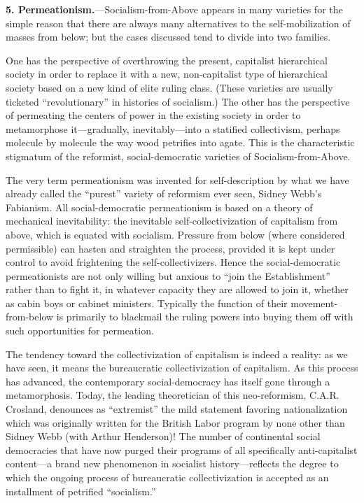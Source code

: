 \textbf{5. Permeationism.}---Socialism-from-Above appears in many varieties for the simple reason that there are always many alternatives to the self-mobilization of masses from below; but the cases discussed tend to divide into two families.

One has the perspective of overthrowing the present, capitalist hierarchical society in order to replace it with a new, non-capitalist type of hierarchical society based on a new kind of elite ruling class. (These varieties are usually ticketed ``revolutionary'' in histories of socialism.) The other has the perspective of permeating the centers of power in the existing society in order to metamorphose it---gradually, inevitably---into a statified collectivism, perhaps molecule by molecule the way wood petrifies into agate. This is the characteristic stigmatum of the reformist, social-democratic varieties of Socialism-from-Above.

The very term permeationism was invented for self-description by what we have already called the ``purest'' variety of reformism ever seen, Sidney Webb's Fabianism. All social-democratic permeationism is based on a theory of mechanical inevitability: the inevitable self-collectivization of capitalism from above, which is equated with socialism. Pressure from below (where considered permissible) can hasten and straighten the process, provided it is kept under control to avoid frightening the self-collectivizers. Hence the social-democratic permeationists are not only willing but anxious to ``join the Establishment'' rather than to fight it, in whatever capacity they are allowed to join it, whether as cabin boys or cabinet ministers. Typically the function of their movement-from-below is primarily to blackmail the ruling powers into buying them off with such opportunities for permeation.

The tendency toward the collectivization of capitalism is indeed a reality: as we have seen, it means the bureaucratic collectivization of capitalism. As this process has advanced, the contemporary social-democracy has itself gone through a metamorphosis. Today, the leading theoretician of this neo-reformism, C.A.R. Crosland, denounces as ``extremist'' the mild statement favoring nationalization which was originally written for the British Labor program by none other than Sidney Webb (with Arthur Henderson)! The number of continental social democracies that have now purged their programs of all specifically anti-capitalist content---a brand new phenomenon in socialist history---reflects the degree to which the ongoing process of bureaucratic collectivization is accepted as an installment of petrified ``socialism.''

